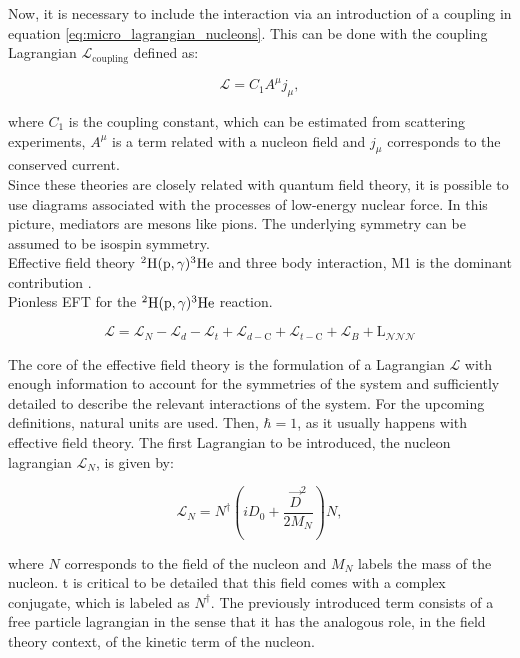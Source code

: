 \documentclass[openany]{book}
\begin{document}
Now, it is necessary to include the interaction via an introduction of a coupling in equation \ref{eq:micro_lagrangian_nucleons}. This can be done with the coupling Lagrangian  $	\mathcal{L}_{\mathrm{coupling}} $ defined as: 

 \begin{equation} \label{eq:micro_lagrangian_coupling}
 	\mathcal{L} =  C_1 A^\mu j_\mu ,
 \end{equation}

where $C_1$ is the coupling constant, which can be estimated from scattering experiments, $A^\mu $ is a term related with a nucleon field and $j_\mu$ corresponds to the conserved current.  \\

Since these theories are closely related with quantum field theory, it is possible to use diagrams associated with the processes of low-energy nuclear force. In this picture, mediators are mesons like pions. The underlying symmetry can be assumed to be isospin symmetry.  \\

Effective field theory $\mathrm{{}^{2}H(p, \gamma){}^{3}He}$ and three body interaction, M1 is the dominant contribution \cite{sadeghi_khalili_godarzi_2013}. \\

Pionless EFT for the $\mathrm{{}^{2}H(p, \gamma){}^{3}He}$ reaction. 

\begin{equation}\label{eq:micro_EFT_lagrangian_extended}
	\mathcal{L} = \mathcal{L}_N  -  \mathcal{L}_d -   \mathcal{L}_t +  \mathcal{L}_{d-\mathrm{C}}  +   \mathcal{L}_{t-\mathrm{C}} + \mathcal{L}_B + \mathrm{L}_{\mathcal{NNN}}
\end{equation}

The core of the effective field theory is the formulation of a Lagrangian $\mathcal{L}$ with enough information to account for the symmetries of the system and sufficiently detailed to describe the relevant interactions of the system. For the upcoming definitions, natural units are used. Then, $\hbar = 1$, as it usually happens with effective field theory. The first Lagrangian to be introduced, the nucleon lagrangian $\mathcal{L}_N$, is given by:
 
\begin{equation}\label{eq:micro_EFT_lagrangian_N}
	 \mathcal{L}_N  = N^{\dagger} \left(i D_0 + \frac{\vec D^2}{2M_N} \right) N,
\end{equation}

where $N$ corresponds to the field of the nucleon and $M_N$ labels the mass of the nucleon.  t is critical to be detailed that this field comes with a complex conjugate, which is labeled as $N^{\dagger}$. The previously introduced term consists of a free particle lagrangian in the sense that it has the analogous role, in the field theory context, of the kinetic term of the nucleon. \\
\end{document}
